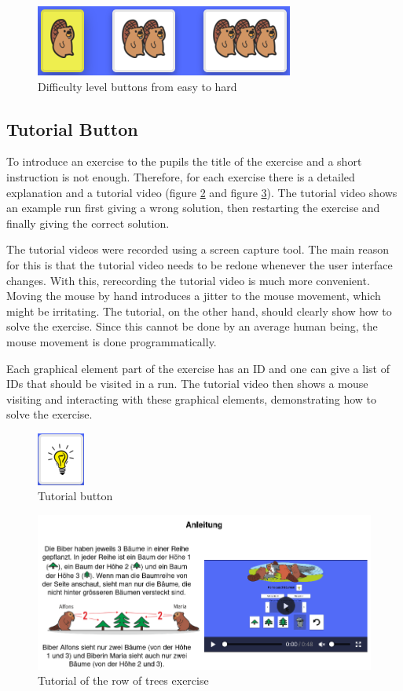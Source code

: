 \begin{figure}[h]
    \centering
    \includegraphics[width=0.5\columnwidth]{figures/difficulty_level.png}
    \caption{Difficulty level buttons from easy to hard}
    \label{fig:difficultyLevels} 
\end{figure}

\subsection*{Tutorial Button}
\label{subsection:tutorial}
To introduce an exercise to the pupils the title of the exercise and a short instruction is not enough. Therefore, for each exercise there is a detailed explanation and a tutorial video (figure \ref{fig:tutorialButton} and figure \ref{fig:tutorialExample}). The tutorial video shows an example run first giving a wrong solution, then restarting the exercise and finally giving the correct solution.

The tutorial videos were recorded using a screen capture tool. The main reason for this is that the tutorial video needs to be redone whenever the user interface changes. With this, rerecording the tutorial video is much more convenient. Moving the mouse by hand introduces a jitter to the mouse movement, which might be irritating. The tutorial, on the other hand, should clearly show how to solve the exercise. Since this cannot be done by an average human being, the mouse movement is done programmatically. 

Each graphical element part of the exercise has an ID and one can give a list of IDs that should be visited in a run. The tutorial video then shows a mouse visiting and interacting with these graphical elements, demonstrating how to solve the exercise. 

\begin{figure}[h]
    \centering
    \includegraphics[width=0.1\columnwidth]{figures/tutorial_button.png}
    \caption{Tutorial button}
    \label{fig:tutorialButton} 
\end{figure}
\begin{figure}[h]
    \centering
    \includegraphics[width=0.5\columnwidth]{figures/tutorial_example.png}
    \caption{Tutorial of the row of trees exercise}
    \label{fig:tutorialExample} 
\end{figure}